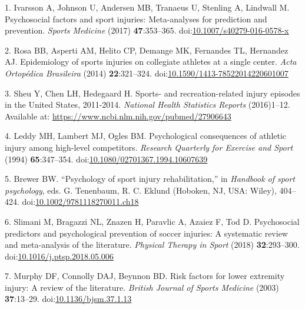 \documentclass[
  english,
  man]{apa6}
\newenvironment{cslreferences}%
  {}%
  {\par}
\begin{document}
\hypertarget{refs}{}
\begin{cslreferences}
\leavevmode\hypertarget{ref-Ivarsson2017}{}%
1. Ivarsson A, Johnson U, Andersen MB, Tranaeus U, Stenling A, Lindwall M. Psychosocial factors and sport injuries: Meta-analyses for prediction and prevention. \emph{Sports Medicine} (2017) \textbf{47}:353--365. doi:\href{https://doi.org/10.1007/s40279-016-0578-x}{10.1007/s40279-016-0578-x}

\leavevmode\hypertarget{ref-Rosa2014}{}%
2. Rosa BB, Asperti AM, Helito CP, Demange MK, Fernandes TL, Hernandez AJ. Epidemiology of sports injuries on collegiate athletes at a single center. \emph{Acta Ortopédica Brasileira} (2014) \textbf{22}:321--324. doi:\href{https://doi.org/10.1590/1413-78522014220601007}{10.1590/1413-78522014220601007}

\leavevmode\hypertarget{ref-Sheu2016}{}%
3. Sheu Y, Chen LH, Hedegaard H. Sports- and recreation-related injury episodes in the United States, 2011-2014. \emph{National Health Statistics Reports} (2016)1--12. Available at: \url{https://www.ncbi.nlm.nih.gov/pubmed/27906643}

\leavevmode\hypertarget{ref-Leddy1994}{}%
4. Leddy MH, Lambert MJ, Ogles BM. Psychological consequences of athletic injury among high-level competitors. \emph{Research Quarterly for Exercise and Sport} (1994) \textbf{65}:347--354. doi:\href{https://doi.org/10.1080/02701367.1994.10607639}{10.1080/02701367.1994.10607639}

\leavevmode\hypertarget{ref-Brewer2012}{}%
5. Brewer BW. ``Psychology of sport injury rehabilitation,'' in \emph{Handbook of sport psychology}, eds. G. Tenenbaum, R. C. Eklund (Hoboken, NJ, USA: Wiley), 404--424. doi:\href{https://doi.org/10.1002/9781118270011.ch18}{10.1002/9781118270011.ch18}

\leavevmode\hypertarget{ref-Slimani2018}{}%
6. Slimani M, Bragazzi NL, Znazen H, Paravlic A, Azaiez F, Tod D. Psychosocial predictors and psychological prevention of soccer injuries: A systematic review and meta-analysis of the literature. \emph{Physical Therapy in Sport} (2018) \textbf{32}:293--300. doi:\href{https://doi.org/10.1016/j.ptsp.2018.05.006}{10.1016/j.ptsp.2018.05.006}

\leavevmode\hypertarget{ref-Murphy2003}{}%
7. Murphy DF, Connolly DAJ, Beynnon BD. Risk factors for lower extremity injury: A review of the literature. \emph{British Journal of Sports Medicine} (2003) \textbf{37}:13--29. doi:\href{https://doi.org/10.1136/bjsm.37.1.13}{10.1136/bjsm.37.1.13}


\end{cslreferences}
\end{document}
